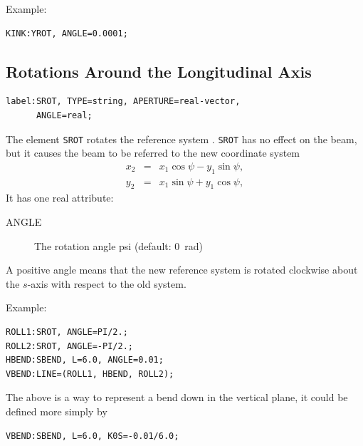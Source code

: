 \noindent Example:
\begin{verbatim}
KINK:YROT, ANGLE=0.0001;
\end{verbatim}

\subsection{Rotations Around the Longitudinal Axis}
\label{sec:srot}
\begin{verbatim}
label:SROT, TYPE=string, APERTURE=real-vector, 
      ANGLE=real;
\end{verbatim}
The element \texttt{SROT} rotates the reference system
.
\texttt{SROT} has no effect on the beam,
but it causes the beam to be referred to the new coordinate system
\[\begin{array}{lcl}
  x_2&=&x_1\cos\psi-y_1\sin\psi, \\
  y_2&=&x_1\sin\psi+y_1\cos\psi,
\end{array}\]
It has one real attribute:
\begin{description}
\item[ANGLE]
  The rotation angle psi (default: 0~rad)
\end{description}
A positive angle means that the new reference system is rotated clockwise
about the $s$-axis with respect to the old system.

\noindent Example:
\begin{verbatim}
ROLL1:SROT, ANGLE=PI/2.;
ROLL2:SROT, ANGLE=-PI/2.;
HBEND:SBEND, L=6.0, ANGLE=0.01;
VBEND:LINE=(ROLL1, HBEND, ROLL2);
\end{verbatim}
The above is a way to represent a bend down in the vertical plane,
it could be defined more simply by
\begin{verbatim}
VBEND:SBEND, L=6.0, K0S=-0.01/6.0;
\end{verbatim}

